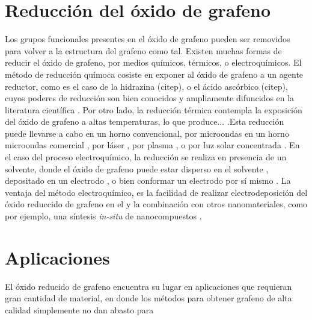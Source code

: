 \section{Reducción del óxido de grafeno}
Los grupos funcionales presentes en el óxido de grafeno pueden ser removidos para volver a la estructura del grafeno como tal.
Existen muchas formas de reducir el óxido de grafeno, por medios químicos, térmicos, o electroquímicos. El método de reducción químoca cosiste en exponer al óxido de grafeno a un agente reductor, como es el caso de la hidrazina (citep), o el ácido ascórbico (citep), cuyos poderes de reducción son bien conocidos y ampliamente difuncidos en la literatura científica \citep{Chua2015}. Por otro lado, la reducción térmica contempla la exposición del óxido de grafeno a altas temperaturas, lo que produce... .Esta reducción puede llevarse a cabo en un horno convencional, por microondas en un horno microondas comercial \citep{Zhu2010a}, por láser \citep{El-Kady2013}, por plasma \citep{Lee2012}, o por luz solar concentrada \citep{Mohandoss2017}. En el caso del proceso electroquímico, la reducción se realiza en presencia de un solvente, donde el óxido de grafeno puede estar disperso en el solvente \citep{Liu2011}, depositado en un electrodo \citep{Harima2011, Toh2014}, o bien conformar un electrodo por sí mismo \citep{Feng2016}. La ventaja del método electroquímico, es la facilidad de realizar electrodeposición del óxido reduccido de grafeno en el  y la combinación con otros nanomateriales, como por ejemplo, una síntesis \emph{in-situ} de nanocompuestos \citep{Liu2011, Xie2014}.

\section{Aplicaciones}
El óxido reducido de grafeno encuentra su lugar en aplicaciones que requieran gran cantidad de material, en donde los métodos para obtener grafeno de alta calidad simplemente no dan abasto para




